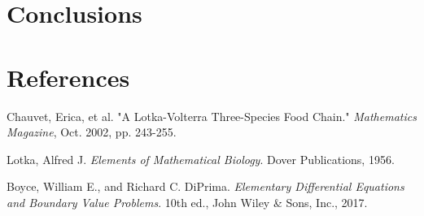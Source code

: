 \documentclass[11pt,oneside]{article}
\begin{document}
	
	\section{Conclusions}
	
	\section{References}
	\begin{hangparas}{.25in}{1}
		Chauvet, Erica, et al. "A Lotka-Volterra Three-Species Food Chain." \textit{Mathematics Magazine}, Oct. 2002, pp. 243-255.
		
		Lotka, Alfred J. \textit{Elements of Mathematical Biology}. Dover Publications, 1956.
		
		Boyce, William E., and Richard C. DiPrima. \textit{Elementary Differential Equations and Boundary Value Problems}. 10th ed., John Wiley \& Sons, Inc., 2017.
		
		
	\end{hangparas}
	
\end{document}
